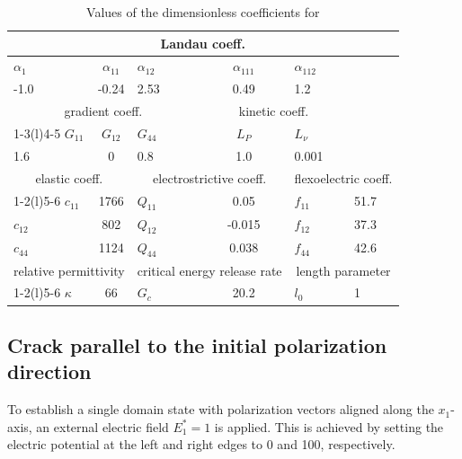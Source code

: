 \documentclass[final,times,fleqn,11pt]{elsarticle}
\begin{document}
\begin{table}[!htbp]
    \centering
    \caption{Values of the dimensionless coefficients for \cite{yong_zhang_phase_2022,eliseev_defect-driven_2018}}
    \label{table1}
    \begin{tabular}{lclcll}
        \toprule
        \multicolumn{6}{c}{Landau coeff.}                                                   \\ \midrule
        $\alpha_1$ & $\alpha_{11}$ & $\alpha_{12}$ & $\alpha_{111}$   & $\alpha_{112}$  &   \\
        -1.0          & -0.24            & 2.53             & 0.49               & 1.2               &   \\
        \multicolumn{3}{c}{gradient coeff.}        & \multicolumn{2}{c}{kinetic coeff.} &   \\ \cmidrule(r){1-3}\cmidrule(l){4-5}
        $G_{11}$   & $G_{12}$      & $G_{44}$      & $L_P$            & $L_\nu$         &   \\
        1.6          & 0             & 0.8             & 1.0                & 0.001               &   \\
        \multicolumn{2}{c}{elastic coeff.}        & \multicolumn{2}{c}{electrostrictive coeff.}      & \multicolumn{2}{c}{flexoelectric coeff.} \\ \cmidrule(r){1-2}\cmidrule{3-4}\cmidrule(l){5-6}
        $c_{11}$   & 1766             & $Q_{11}$      & 0.05                & $f_{11}$        & 51.7 \\
        $c_{12}$   & 802              & $Q_{12}$      &  -0.015              & $f_{12}$        & 37.3 \\
        $c_{44}$   & 1124             & $Q_{44}$      &  0.038              & $f_{44}$        & 42.6 \\
        \multicolumn{2}{c}{relative permittivity} & \multicolumn{2}{c}{critical energy release rate} & \multicolumn{2}{c}{length parameter}      \\ \cmidrule(r){1-2}\cmidrule{3-4}\cmidrule(l){5-6}
        $\kappa$   & 66            & $G_c$         & 20.2               & $l_0$           & 1 \\ \bottomrule
        \end{tabular}
\end{table}

\subsection{Crack parallel to the initial polarization direction}
To establish a single domain state with polarization vectors aligned along the $x_1$-axis, an external electric field $E_{1}^*=1$ is applied. This is achieved by setting the electric potential at the left and right edges to 0 and 100, respectively. 
\end{document}
